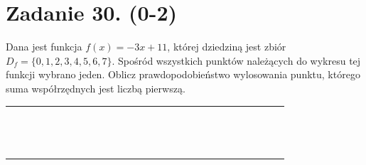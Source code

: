 \documentclass[10pt]{article}
\begin{document}
\section*{Zadanie 30. (0-2)}
Dana jest funkcja \(f(x)=-3 x+11\), której dziedziną jest zbiór \(D_{f}=\{0,1,2,3,4,5,6,7\}\). Spośród wszystkich punktów należących do wykresu tej funkcji wybrano jeden. Oblicz prawdopodobieństwo wylosowania punktu, którego suma współrzędnych jest liczbą pierwszą.

\begin{center}
\begin{tabular}{|c|c|c|c|c|c|c|c|c|c|c|c|c|c|c|c|c|c|c|c|c|c|c|c|c|c|c|c|}
\hline
 &  &  &  &  &  &  &  &  &  &  &  &  &  &  &  &  &  &  &  &  &  &  &  &  &  &  &  \\
\hline
 &  &  &  &  &  &  &  &  &  &  &  &  &  &  &  &  &  &  &  &  &  &  &  &  &  &  &  \\
\hline
 &  &  &  &  &  &  &  &  &  &  &  &  &  &  &  &  &  &  &  &  &  &  &  &  &  &  &  \\
\hline
 &  &  &  &  &  &  &  &  &  &  &  &  &  &  &  &  &  &  &  &  &  &  &  &  &  &  &  \\
\hline
 &  &  &  &  &  &  &  &  &  &  &  &  &  &  &  &  &  &  &  &  &  &  &  &  &  &  &  \\
\hline
 &  &  &  &  &  &  &  &  &  &  &  &  &  &  &  &  &  &  &  &  &  &  &  &  &  &  &  \\
\hline
 &  &  &  &  &  &  &  &  &  &  &  &  &  &  &  &  &  &  &  &  &  &  &  &  &  &  &  \\
\hline
 &  &  &  &  &  &  &  &  &  &  &  &  &  &  &  &  &  &  &  &  &  &  &  &  &  &  &  \\
\hline
 &  &  &  &  &  &  &  &  &  &  &  &  &  &  &  &  &  &  &  &  &  &  &  &  &  &  &  \\
\hline
 &  &  &  &  &  &  &  &  &  &  &  &  &  &  &  &  &  &  &  &  &  &  &  &  &  &  &  \\
\hline
 &  &  &  &  &  &  &  &  &  &  &  &  &  &  &  &  &  &  &  &  &  &  &  &  &  &  &  \\
\hline
 &  &  &  &  &  &  &  &  &  &  &  &  &  &  &  &  &  &  &  &  &  &  &  &  &  &  &  \\
\hline
 &  &  &  &  &  &  &  &  &  &  &  &  &  &  &  &  &  &  &  &  &  &  &  &  &  &  &  \\
\hline
 &  &  &  &  &  &  &  &  &  &  &  &  &  &  &  &  &  &  &  &  &  &  &  &  &  &  &  \\
\hline
 &  &  &  &  &  &  &  &  &  &  &  &  &  &  &  &  &  &  &  &  &  &  &  &  &  &  &  \\

\end{tabular}
\end{center}
\end{document}
